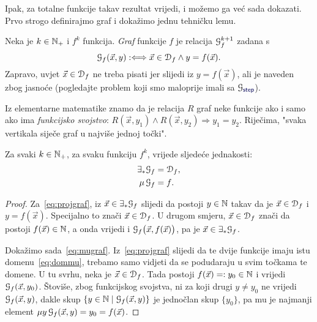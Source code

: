 Ipak, za totalne funkcije takav rezultat vrijedi, i možemo ga već sada dokazati. Prvo strogo definirajmo graf i dokažimo jednu tehničku lemu.

\begin{definicija}[{name=[graf brojevne funkcije]}]
Neka je $k\in{\mathbb N}_+$ i $f^k$ funkcija. \emph{Graf} funkcije $f$ je relacija $\mathcal G_{f}^{k+1}$ zadana s
\begin{equation}
    \label{eq:defgraf}\mathcal G_{f}(\vec x,y):\Longleftrightarrow\vec x\in\mathcal D_{f}\land y=f(\vec x)\text.
\end{equation}
Zapravo, uvjet $\vec x\in\mathcal D_{f}$ ne treba pisati jer slijedi iz $y=f(\vec x)$, ali je naveden zbog jasnoće (pogledajte problem koji smo maloprije imali sa $\graf{\f{step}}$).
\end{definicija}

\begin{napomena}[{name=[funkcijsko svojstvo grafova]}]\label{nap:graf=funsv}
    Iz elementarne matematike znamo da je relacija $R$ graf neke funkcije ako i samo ako ima \emph{funkcijsko svojstvo}: $R(\vec x,y_1)\land R(\vec x,y_2)\Rightarrow y_1=y_2$. Riječima, "svaka vertikala siječe graf u najviše jednoj točki".
\end{napomena}

\begin{lema}[{name=[projekcija i minimizacija grafa]}]\label{lm:projmugraf}
Za svaki $k\in{\mathbb N}_+$, za svaku funkciju $f^k$, vrijede sljedeće jednakosti:
\begin{align}
    \label{eq:projgraf}\exists_*\mathcal G_{f}&=\mathcal D_{f}\text,\\
    \label{eq:mugraf}\mu\,\mathcal G_{f}&=f\text.
\end{align}
\end{lema}
\begin{proof}
Za~\eqref{eq:projgraf}, iz $\vec x\in\exists_*\mathcal G_{f}$ slijedi da postoji $y\in{\mathbb N}$ takav da je $\vec x\in\mathcal D_{f}$ i $y=f(\vec x)$. Specijalno to znači $\vec x\in\mathcal D_{f}$. U drugom smjeru, $\vec x\in\mathcal D_{f}$ znači da postoji $f(\vec x)\in{\mathbb N}$, a onda vrijedi i $\mathcal G_{f}\bigl(\vec x,f(\vec x)\bigr)$, pa je $\vec x\in\exists_*\mathcal G_{f}$.

Dokažimo sada~\eqref{eq:mugraf}. Iz~\eqref{eq:projgraf} slijedi da te dvije funkcije imaju istu domenu~\eqref{eq:dommu}, trebamo samo vidjeti da se podudaraju u svim točkama te domene. U tu svrhu, neka je $\vec x\in\mathcal D_{f}$. Tada postoji $f(\vec x)=:y_0\in{\mathbb N}$ i vrijedi $\mathcal G_{f}(\vec x,y_0)$. Štoviše, zbog funkcijskog svojstva, ni za koji drugi $y\ne y_0$ ne vrijedi $\mathcal G_{f}(\vec x,y)$, dakle skup $\{y\in{\mathbb N}\mid\mathcal G_{f}(\vec x,y)\}$ je jednočlan skup $\{y_0\}$, pa mu je najmanji element $\mu y\,\mathcal G_{f}(\vec x,y)=y_0=f(\vec x)$.
\end{proof}

